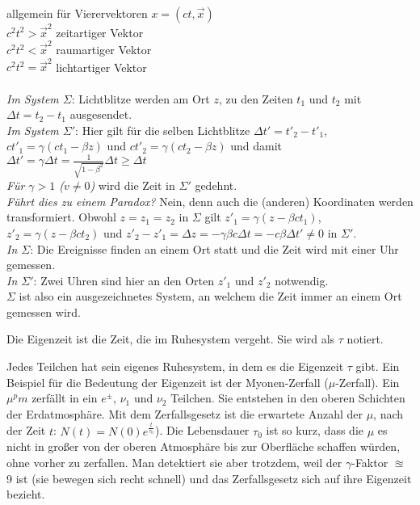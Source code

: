 allgemein für Vierervektoren $x = (ct, \vec{x})$\\
$c^2 t^2 > \vec{x}^2$ zeitartiger Vektor\\
$c^2 t^2 < \vec{x}^2$ raumartiger Vektor\\
$c^2 t^2 = \vec{x}^2$ lichtartiger Vektor\\
~\\
\textit{Im System $\Sigma$}: Lichtblitze werden am Ort $z$, zu den Zeiten $t_1$ und $t_2$ mit $\Delta t = t_2 - t_1$ ausgesendet.\\
\textit{Im System $\Sigma'$}: Hier gilt für die selben Lichtblitze $\Delta t' = t'_2 - t'_1$, $c t'_1 = \gamma (c t_1 - \beta z)$ und $c t'_2 = \gamma (ct_2 - \beta z)$ und damit $\Delta t' = \gamma \Delta t = \frac{1}{\sqrt{1 - \beta^2}} \Delta t \geq \Delta t$\\
\textit{Für $\gamma > 1$ ($v \neq 0$)} wird die Zeit in $\Sigma'$ gedehnt.\\
\textit{Führt dies zu einem Paradox?} Nein, denn auch die (anderen) Koordinaten werden transformiert. Obwohl $z = z_1 = z_2$ in $\Sigma$ gilt $z'_1 = \gamma (z - \beta c t_1)$, $z'_2 = \gamma (z - \beta c t_2)$ und $z'_2 - z'_1 = \Delta z = - \gamma \beta c \Delta t = - c \beta \Delta t' \neq 0$ in $\Sigma'$.\\
\textit{In $\Sigma$}: Die Ereignisse finden an einem Ort statt und die Zeit wird mit einer Uhr gemessen.\\
\textit{In $\Sigma'$}: Zwei Uhren sind hier an den Orten $z'_1$ und $z'_2$ notwendig.\\
$\Sigma$ ist also ein ausgezeichnetes System, an welchem die Zeit immer an einem Ort gemessen wird.

\begin{definition*}[Eigenzeit]
    Die Eigenzeit ist die Zeit, die im Ruhesystem vergeht. Sie wird als $\tau$ notiert.
\end{definition*}

\begin{beispiel*}[$\mu$-Zerfall]
	Jedes Teilchen hat sein eigenes Ruhesystem, in dem es die Eigenzeit $\tau$ gibt. Ein Beispiel für die Bedeutung der Eigenzeit ist der Myonen-Zerfall ($\mu$-Zerfall). Ein $\mu^pm$ zerfällt in ein $e^\pm$, $\nu_1$ und $\nu_2$ Teilchen. Sie entstehen in den oberen Schichten der Erdatmosphäre. Mit dem Zerfallsgesetz ist die erwartete Anzahl der $\mu$, nach der Zeit $t$: $N(t) = N(0) e^{\frac{t}{\tau_0}}$). Die Lebensdauer $\tau_0$ ist so kurz, dass die $\mu$ es nicht in großer von der oberen Atmosphäre bis zur Oberfläche schaffen würden, ohne vorher zu zerfallen. Man detektiert sie aber trotzdem, weil der $\gamma$-Faktor $\approxeq$ 9 ist (sie bewegen sich recht schnell) und das Zerfallsgesetz sich auf ihre Eigenzeit bezieht. 
\end{beispiel*}

